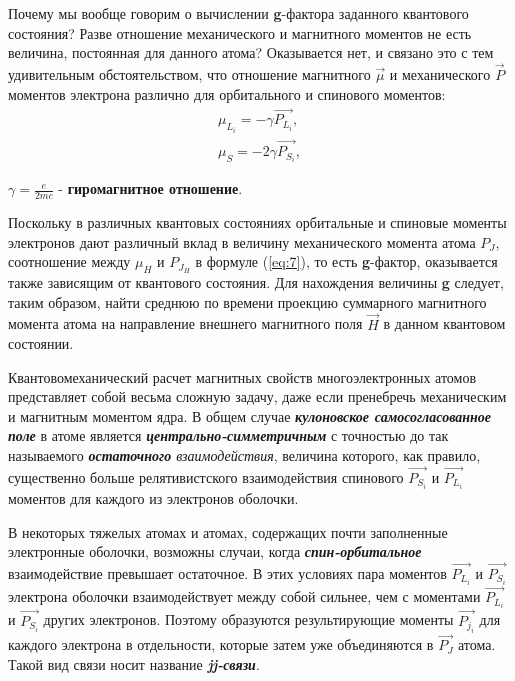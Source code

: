 
Почему мы вообще говорим о вычислении \textbf{g}-фактора заданного квантового состояния? Разве отношение механического и магнитного моментов не есть величина, постоянная для данного атома? Оказывается нет, и связано это с тем удивительным 
обстоятельством, что отношение магнитного $\vec{\mu}$ и механического $\vec{P}$ моментов электрона различно для орбитального и 
спинового моментов: 
\begin{gather} 
\label{eq:12} 
\mu_{L_i} = -\gamma \vec{P_{L_i}}, \\
\mu_{S} = -2\gamma \vec{P_{S_i}}, 
\end{gather}

$\gamma=\frac{e}{2mc}$ - \textbf{гиромагнитное отношение}.

Поскольку в различных квантовых состояниях орбитальные и спиновые моменты электронов дают различный вклад в величину механического момента атома $P_J$, соотношение между $\mu_H$ и $P_{J_H}$  в формуле (\ref{eq:7}), то есть \textbf{g}-фактор, оказывается также зависящим от квантового состояния. Для нахождения величины \textbf{g} следует, таким образом, найти среднюю по времени проекцию суммарного магнитного момента атома на направление внешнего магнитного поля $\vec{H}$ в данном квантовом состоянии.

Квантовомеханический расчет магнитных свойств многоэлектронных атомов представляет собой весьма сложную задачу, даже если пренебречь механическим и магнитным моментом ядра. В общем случае {\itshape{\textbf{кулоновское самосогласованное поле}}} в атоме является {\itshape\textbf{центрально-симметричным}} с точностью до так называемого {\itshape\textbf{остаточного} взаимодействия}, величина которого, как правило, существенно больше релятивистского взаимодействия спинового $\vec{P_{S_i}}$ и $\vec{P_{L_i}}$ моментов для каждого из электронов оболочки.

В некоторых тяжелых атомах и атомах, содержащих почти заполненные электронные оболочки, возможны случаи, когда {\itshape\textbf{спин-орбитальное}} взаимодействие превышает остаточное. В этих условиях пара моментов $\vec{P_{L_i}}$ и $\vec{P_{S_i}}$ электрона оболочки взаимодействует между собой сильнее, чем с моментами $\vec{P_{L_i}}$ и $\vec{P_{S_i}}$ других электронов. Поэтому образуются результирующие моменты $\vec{P_{j_i}}$ для каждого электрона в отдельности, которые затем уже объединяются в $\vec{P_J}$ атома. Такой вид связи носит название {\itshape\textbf{jj-связи}}.

